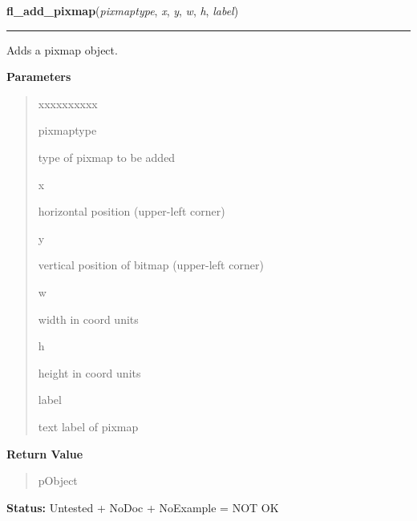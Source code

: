     \label{xformslib:library:fl_add_pixmap}

    \vspace{0.5ex}

\hspace{.8\funcindent}\begin{boxedminipage}{\funcwidth}

    \raggedright \textbf{fl\_add\_pixmap}(\textit{pixmaptype}, \textit{x}, \textit{y}, \textit{w}, \textit{h}, \textit{label})

    \vspace{-1.5ex}

    \rule{\textwidth}{0.5\fboxrule}
\setlength{\parskip}{2ex}
    Adds a pixmap object.

\setlength{\parskip}{1ex}
      \textbf{Parameters}
      \vspace{-1ex}

      \begin{quote}
        \begin{Ventry}{xxxxxxxxxx}

          \item[pixmaptype]

          type of pixmap to be added

          \item[x]

          horizontal position (upper-left corner)

          \item[y]

          vertical position of bitmap (upper-left corner)

          \item[w]

          width in coord units

          \item[h]

          height in coord units

          \item[label]

          text label of pixmap

        \end{Ventry}

      \end{quote}

      \textbf{Return Value}
    \vspace{-1ex}

      \begin{quote}
      pObject

      \end{quote}

\textbf{Status:} Untested + NoDoc + NoExample = NOT OK



    \end{boxedminipage}

